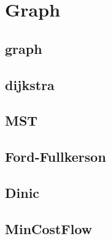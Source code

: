 \section{Graph}

\subsection{graph}


\subsection{dijkstra}


\subsection{MST}


\subsection{Ford-Fullkerson}


\subsection{Dinic}


\subsection{MinCostFlow}


